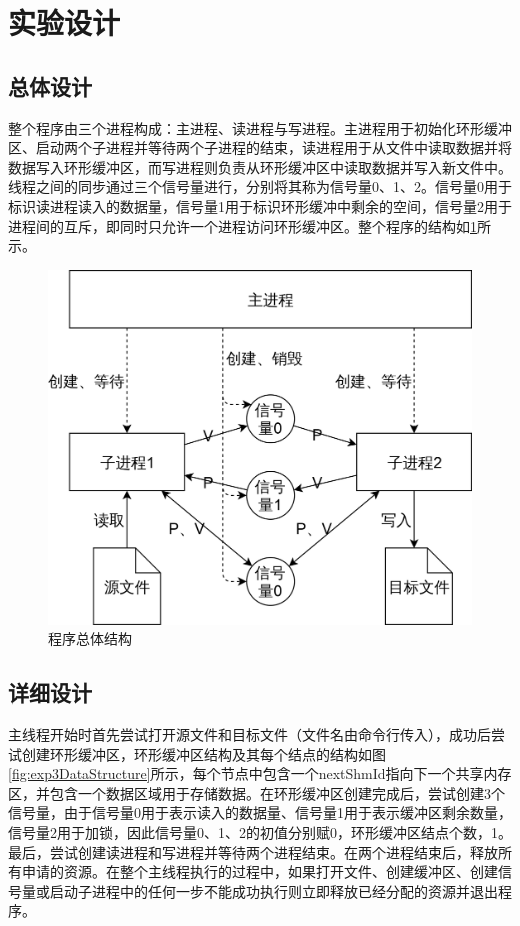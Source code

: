 \documentclass{report}
\begin{document}
\section{实验设计}
\label{sec:shi_yan_she_ji_3}

\subsection{总体设计}
\label{sub:zong_ti_she_ji_3}

整个程序由三个进程构成：主进程、读进程与写进程。主进程用于初始化环形缓冲区、启动两个子进程并等待两个子进程的结束，读进程用于从文件中读取数据并将数据写入环形缓冲区，而写进程则负责从环形缓冲区中读取数据并写入新文件中。线程之间的同步通过三个信号量进行，分别将其称为信号量0、1、2。信号量0用于标识读进程读入的数据量，信号量1用于标识环形缓冲中剩余的空间，信号量2用于进程间的互斥，即同时只允许一个进程访问环形缓冲区。整个程序的结构如\ref{fig:exp3Structure}所示。

\begin{figure}[ht]
    \centering
    \includegraphics[width=0.4\linewidth]{exp3Structure.png}
    \caption{程序总体结构}
    \label{fig:exp3Structure}
\end{figure}


\subsection{详细设计}
\label{sub:xiang_xi_she_ji_3}

主线程开始时首先尝试打开源文件和目标文件（文件名由命令行传入），成功后尝试创建环形缓冲区，环形缓冲区结构及其每个结点的结构如图\ref{fig:exp3DataStructure}所示，每个节点中包含一个nextShmId指向下一个共享内存区，并包含一个数据区域用于存储数据。在环形缓冲区创建完成后，尝试创建3个信号量，由于信号量0用于表示读入的数据量、信号量1用于表示缓冲区剩余数量，信号量2用于加锁，因此信号量0、1、2的初值分别赋0，环形缓冲区结点个数，1。最后，尝试创建读进程和写进程并等待两个进程结束。在两个进程结束后，释放所有申请的资源。在整个主线程执行的过程中，如果打开文件、创建缓冲区、创建信号量或启动子进程中的任何一步不能成功执行则立即释放已经分配的资源并退出程序。
\end{document}

